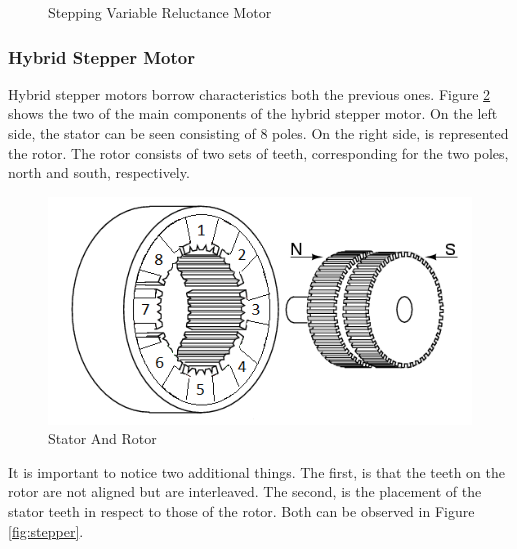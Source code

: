 \begin{figure}[htp]
\begin{center}
{        }
    \hfill
  	\hfill
  	\caption{Stepping Variable Reluctance Motor}
  	\label{fig:stepping_var_rel}
  	\end{center}
\end{figure}
\newpage
\subsubsection{Hybrid Stepper Motor}
Hybrid stepper motors borrow characteristics both the previous ones. Figure \ref{fig:hybrid_components} shows the two of the main components of the hybrid stepper motor. On the left side, the stator can be seen consisting of 8 poles. On the right side, is represented the rotor. The rotor consists of two sets of teeth, corresponding for the two poles, north and south, respectively.

\begin{figure}[h]
	\centering
	\includegraphics[width=\textwidth]{figures/move/motor27.png}
	\caption{Stator And Rotor}
	\label{fig:hybrid_components}
\end{figure}

It is important to notice two additional things. The first, is that the teeth on the rotor are not aligned but are interleaved. The second, is the placement of the stator teeth in respect to those of the rotor. Both can be observed in Figure \ref{fig:stepper}.

